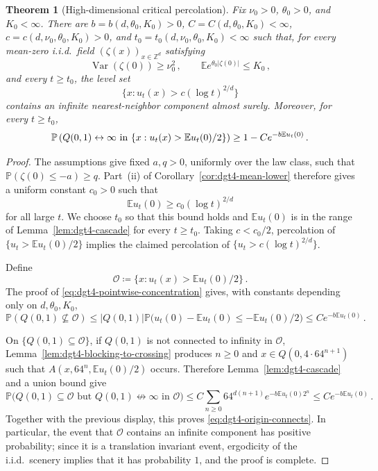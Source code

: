 \documentclass[11pt]{amsart}
\theoremstyle{plain}
\newtheorem{theorem}{Theorem}[section]
\theoremstyle{definition}
\newcommand{\Z}{\mathbb{Z}}
\newcommand{\E}{\mathbb{E}}
\renewcommand{\P}{\mathbb{P}}
\DeclareMathOperator{\Var}{Var}
\begin{document}
	\begin{theorem}[High-dimensional critical percolation]\label{thm:dgt4-nontriviality}
		Fix $\nu_0>0$, $\theta_0>0$, and $K_0<\infty$. There are
		$b=b(d,\theta_0,K_0)>0$, $C=C(d,\theta_0,K_0)<\infty$,
		$c=c(d,\nu_0,\theta_0,K_0)>0$, and
		$t_0=t_0(d,\nu_0,\theta_0,K_0)<\infty$ such that, for every mean-zero
		i.i.d.\ field $(\zeta(x))_{x\in\Z^d}$ satisfying
		\[
			\Var(\zeta(0))\geq\nu_0^2\, ,
			\qquad
			\E e^{\theta_0|\zeta(0)|}\leq K_0\, ,
		\]
		and every $t\geq t_0$, the level set
		\[
			\{x:u_t(x)>c(\log t)^{2/d}\}
		\]
		contains an infinite nearest-neighbor component almost surely.
		Moreover, for every $t\geq t_0$,
		\begin{equation}\label{eq:dgt4-origin-connects}
			\P\left(Q(0,1)\leftrightarrow\infty
			\textup{ in }\{x:u_t(x)>\E u_t(0)/2\}\right)
			\geq 1-Ce^{-b\E u_t(0)}\, .
		\end{equation}
		\end{theorem}
		\begin{proof}
			The assumptions give fixed $a,q>0$, uniformly over the law class, such
			that $\P(\zeta(0)\leq-a)\geq q$. Part~\textup{(ii)} of
			Corollary~\ref{cor:dgt4-mean-lower} therefore gives a uniform constant
			$c_{0}>0$ such that
			\[
				\E u_t(0)\geq c_{0}(\log t)^{2/d}
			\]
			for all large $t$. We choose $t_0$ so that this bound holds and
			$\E u_t(0)$ is in the range of Lemma~\ref{lem:dgt4-cascade} for
			every $t\geq t_0$. Taking $c<c_{0}/2$, percolation of
			$\{u_t>\E u_t(0)/2\}$ implies the claimed percolation of
			$\{u_t>c(\log t)^{2/d}\}$.

			Define
			\[
				\mathcal O\coloneqq\{x:u_t(x)>\E u_t(0)/2\}\, .
			\]
			The proof of \eqref{eq:dgt4-pointwise-concentration} gives, with
			constants depending only on $d,\theta_0,K_0$,
			\[
				\P(Q(0,1)\not\subseteq\mathcal O)
				\leq
				|Q(0,1)| \P\bigl(u_t(0)-\E u_t(0)\leq-\E u_t(0)/2\bigr)
				\leq
				Ce^{-b\E u_t(0)}\, .
			\]

			On $\{Q(0,1)\subseteq\mathcal O\}$, if $Q(0,1)$ is not connected to infinity in $\mathcal O$, Lemma~\ref{lem:dgt4-blocking-to-crossing}
			produces $n\geq0$ and $x\in Q(0,4\cdot64^{n+1})$ such that
			$A(x,64^n,\E u_t(0)/2)$ occurs. Therefore Lemma~\ref{lem:dgt4-cascade} and a union bound give
			\[
				\P\bigl(Q(0,1)\subseteq\mathcal O\text{ but }
				Q(0,1)\not\leftrightarrow\infty\text{ in }\mathcal O\bigr)
				\leq
				C\sum_{n\geq0}64^{d(n+1)} e^{-b\E u_t(0)2^n}
				\leq
				Ce^{-b\E u_t(0)}\, .
			\]
			Together with the previous display, this proves
			\eqref{eq:dgt4-origin-connects}. In particular, the event that $\mathcal O$ contains an infinite component has positive
			probability; since it is a translation invariant event, ergodicity of the i.i.d.\ scenery implies that it has probability $1$, and the proof is complete.
		\end{proof}



\end{document}
